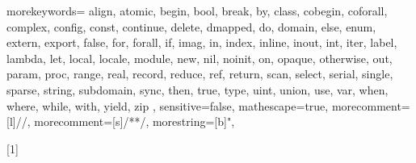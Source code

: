   {
    morekeywords={
      align, atomic,
      begin, bool, break, by,
      class, cobegin, coforall, complex, config, const, continue,
      delete, dmapped, do, domain,
      else, enum, extern, export,
      false, for, forall,
      if, imag, in, index, inline, inout, int, iter,
      label, lambda, let, local, locale,
      module,
      new, nil, noinit,
      on, opaque, otherwise, out,
      param, proc,
      range, real, record, reduce, ref, return,
      scan, select, serial, single, sparse, string, subdomain, sync,
      then, true, type,
      uint, union, use,
      var,
      when, where, while, with,
      yield,
      zip
    },
    sensitive=false,
    mathescape=true,
    morecomment=[l]{//},
    morecomment=[s]{/*}{*/},
    morestring=[b]",
}


\newcommand{\chpl}[1]{\lstinline[language=chapel,basicstyle=\small\ttfamily,keywordstyle=\bfseries]!#1!}
\newcommand{\varname}[1]{\emph{#1}}
\newcommand{\typename}[1]{\emph{#1}}
\newcommand{\fnname}[1]{\chpl{#1}}




[1]
  {\lstset{language=chapel,xleftmargin=2pc,stepnumber=0,keywordstyle=}}{}

